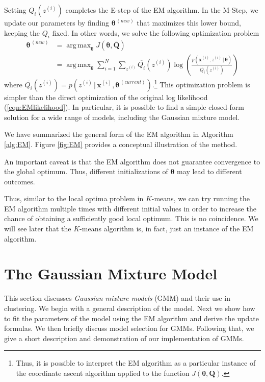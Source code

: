 \documentclass[final,3p,times,twocolumn]{elsarticle}
\DeclareMathOperator*{\argmax}{arg\,max}
\let\bs\boldsymbol
\let\ol\overline
\begin{document}
Setting $Q_i(z^{(i)})$ completes the E-step of the EM algorithm.
In the M-Step, we update our parameters by finding $\bs\theta^{\,(new)}$ that maximizes this lower bound, keeping the $Q_i$ fixed.
In other words, we solve the following optimization problem
\begin{equation}
\label{eqn:EM-M}
\begin{split}
\bs\theta^{\,(new)} &= \argmax_{\bs\theta} J(\bs\theta,\ol{\bs Q}) \\
&= \argmax_{\bs\theta}\sum_{i=1}^N \sum_{z^{(i)}} \ol{Q_i}(z^{(i)}) \log \left( \frac{p(\bs x^{(i)},z^{(i)}\,|\,\bs\theta)}{\ol{Q_i}(z^{(i)})}\right) 
\end{split}
\end{equation}
where $\ol{Q_i}(z^{(i)}) = p(z^{(i)}\,|\,\bs x^{(i)},\bs\theta^{\,(current)})$.\footnote{Thus, it is possible to interpret the EM algorithm as a particular instance of the coordinate ascent algorithm applied to the function $J(\bs\theta,\bs Q)$.}
This optimization problem is simpler than the direct optimization of the original log likelihood (\ref{eqn:EMlikelihood}).
In particular, it is possible to find a simple closed-form solution for a wide range of models, including the Gaussian mixture model.

We have summarized the general form of the EM algorithm in Algorithm \ref{alg:EM}.
Figure \ref{fig:EM} provides a conceptual illustration of the method.

An important caveat is that the EM algorithm does not guarantee convergence to the global optimum.
Thus, different initializations of $\bs\theta$ may lead to different outcomes.

Thus, similar to the local optima problem in $K$-means, we can try running the EM algorithm multiple times with different initial values in order to increase the chance of obtaining a sufficiently good local optimum.
This is no coincidence. 
We will see later that the $K$-means algorithm is, in fact, just an instance of the EM algorithm.

\section{The Gaussian Mixture Model}
\label{sect:gmm}
This section discusses \emph{Gaussian mixture models} (GMM) and their use in clustering.
We begin with a general description of the model.
Next we show how to fit the parameters of the model using the EM algorithm and derive the update formulas.
We then briefly discuss model selection for GMMs.
Following that, we give a short description and demonstration of our implementation of GMMs.
\end{document}
